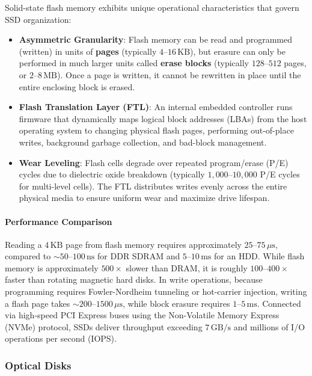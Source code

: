 Solid-state flash memory exhibits unique operational characteristics that govern SSD organization:
\begin{itemize}
    \item \textbf{Asymmetric Granularity}: Flash memory can be read and programmed (written) in units of \textbf{pages} (typically $4\text{--}16\,\text{KB}$), but erasure can only be performed in much larger units called \textbf{erase blocks} (typically $128\text{--}512$ pages, or $2\text{--}8\,\text{MB}$). Once a page is written, it cannot be rewritten in place until the entire enclosing block is erased.
    \item \textbf{Flash Translation Layer (FTL)}: An internal embedded controller runs firmware that dynamically maps logical block addresses (LBAs) from the host operating system to changing physical flash pages, performing out-of-place writes, background garbage collection, and bad-block management.
    \item \textbf{Wear Leveling}: Flash cells degrade over repeated program/erase (P/E) cycles due to dielectric oxide breakdown (typically $1{,}000\text{--}10{,}000$ P/E cycles for multi-level cells). The FTL distributes writes evenly across the entire physical media to ensure uniform wear and maximize drive lifespan.
\end{itemize}

\paragraph{Performance Comparison}
Reading a $4\,\text{KB}$ page from flash memory requires approximately $25\text{--}75\,\mu\text{s}$, compared to $\sim 50\text{--}100\,\text{ns}$ for DDR SDRAM and $5\text{--}10\,\text{ms}$ for an HDD. While flash memory is approximately $500\times$ slower than DRAM, it is roughly $100\text{--}400\times$ faster than rotating magnetic hard disks. In write operations, because programming requires Fowler-Nordheim tunneling or hot-carrier injection, writing a flash page takes $\sim 200\text{--}1500\,\mu\text{s}$, while block erasure requires $1\text{--}5\,\text{ms}$. Connected via high-speed PCI Express buses using the Non-Volatile Memory Express (NVMe) protocol, SSDs deliver throughput exceeding $7\,\text{GB/s}$ and millions of I/O operations per second (IOPS).

\subsubsection{Optical Disks}

